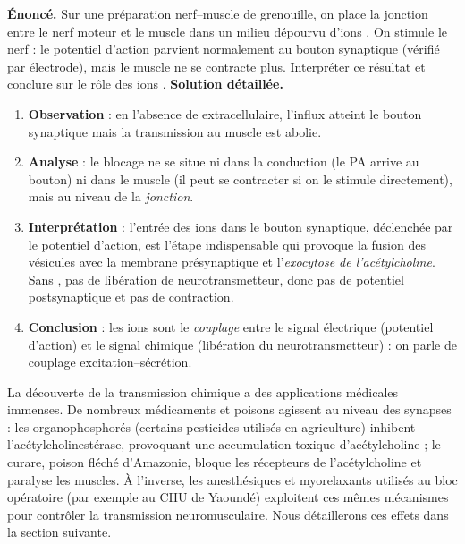 \documentclass[11pt]{article}
\begin{document}
\begin{exoresolu}
\textbf{Énoncé.} Sur une préparation nerf--muscle de grenouille, on place la jonction entre le nerf moteur et le muscle dans un milieu dépourvu d'ions . On stimule le nerf : le potentiel d'action parvient normalement au bouton synaptique (vérifié par électrode), mais le muscle ne se contracte plus. Interpréter ce résultat et conclure sur le rôle des ions .
\tcblower
\textbf{Solution détaillée.}
\begin{enumerate}
\item \textbf{Observation} : en l'absence de  extracellulaire, l'influx atteint le bouton synaptique mais la transmission au muscle est abolie.
\item \textbf{Analyse} : le blocage ne se situe ni dans la conduction (le PA arrive au bouton) ni dans le muscle (il peut se contracter si on le stimule directement), mais au niveau de la \emph{jonction}.
\item \textbf{Interprétation} : l'entrée des ions  dans le bouton synaptique, déclenchée par le potentiel d'action, est l'étape indispensable qui provoque la fusion des vésicules avec la membrane présynaptique et l'\emph{exocytose de l'acétylcholine}. Sans , pas de libération de neurotransmetteur, donc pas de potentiel postsynaptique et pas de contraction.
\item \textbf{Conclusion} : les ions  sont le \emph{couplage} entre le signal électrique (potentiel d'action) et le signal chimique (libération du neurotransmetteur) : on parle de couplage excitation--sécrétion.
\end{enumerate}
\end{exoresolu}

\begin{savaistu}
La découverte de la transmission chimique a des applications médicales immenses. De nombreux médicaments et poisons agissent au niveau des synapses : les organophosphorés (certains pesticides utilisés en agriculture) inhibent l'acétylcholinestérase, provoquant une accumulation toxique d'acétylcholine ; le curare, poison fléché d'Amazonie, bloque les récepteurs de l'acétylcholine et paralyse les muscles. À l'inverse, les anesthésiques et myorelaxants utilisés au bloc opératoire (par exemple au CHU de Yaoundé) exploitent ces mêmes mécanismes pour contrôler la transmission neuromusculaire. Nous détaillerons ces effets dans la section suivante.
\end{savaistu}
\end{document}
